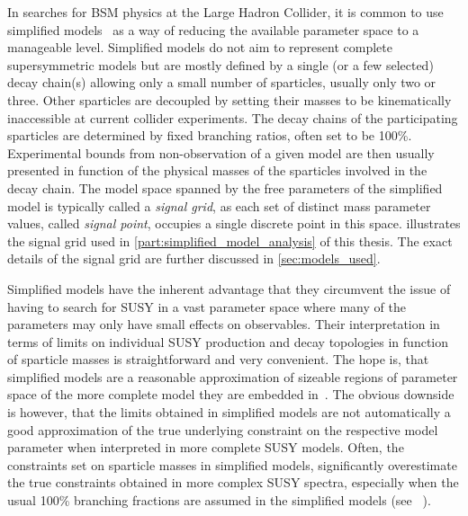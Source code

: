In searches for BSM physics at the Large Hadron Collider, it is common to use simplified models~\cite{SimplifiedModels1:2008ag,SimplifiedModels2:2011wf,Alves:2011sq} as a way of reducing the available parameter space to a manageable level.
Simplified models do not aim to represent complete supersymmetric models but are mostly defined by a single (or a few selected) decay chain(s) allowing only a small number of sparticles, usually only two or three.
Other sparticles are decoupled by setting their masses to be kinematically inaccessible at current collider experiments. The decay chains of the participating sparticles are determined by fixed branching ratios, often set to be 100\%.
Experimental bounds from non-observation of a given model are then usually presented in function of the physical masses of the sparticles involved in the decay chain.
The model space spanned by the free parameters of the simplified model is typically called a \textit{signal grid}, as each set of distinct mass parameter values, called \textit{signal point}, occupies a single discrete point in this space.  illustrates the signal grid used in \cref{part:simplified_model_analysis} of this thesis. The exact details of the signal grid are further discussed in \cref{sec:models_used}.
 
Simplified models have the inherent advantage that they circumvent the issue of having to search for SUSY in a vast parameter space where many of the parameters may only have small effects on observables. Their interpretation in terms of limits on individual SUSY production and decay topologies in function of sparticle masses is straightforward and very convenient.
The hope is, that simplified models are a reasonable approximation of sizeable regions of parameter space of the more complete model they are embedded in~\cite{pdg2020}. The obvious downside is however, that the limits obtained in simplified models are not automatically a good approximation of the true underlying constraint on the respective model parameter when interpreted in more complete SUSY models.
Often, the constraints set on sparticle masses in simplified models, significantly overestimate the true constraints obtained in more complex SUSY spectra, especially when the usual 100\% branching fractions are assumed in the simplified models (see \eg~\cite{Ambrogi:2017lov,Buchmueller:2013exa}).

